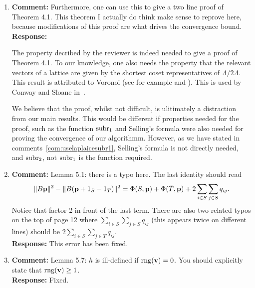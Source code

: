 \documentclass[a4paper,10pt]{article}
\begin{document}
\begin{enumerate}

\item\textbf{Comment:} \label{com:provethm4.1}
Furthermore, one can use this to give a two line proof of Theorem 4.1.  This theorem I actually do think make sense to reprove here, because modifications of this proof are what drives the convergence bound. 
\\\textbf{Response:}

The property decribed by the reviewer is indeed needed to give a proof of Theorem 4.1.  To our knowledge, one also needs the property that the relevant vectors of a lattice are given by the shortest coset representatives of $\Lambda / 2\Lambda$.  This result is attributed to Voronoi (see for example \cite[Theorem~2]{ConwaySloane1992_voronoi_lattice_3d_obtuse_superbases} and \cite[Theorem~3.2]{MicciancioVoulgaris_deterministic_jv_2013}).  This is used by Conway and Sloane in~\cite[Theorem~3]{ConwaySloane1992_voronoi_lattice_3d_obtuse_superbases}.

We believe that the proof, whilst not difficult, is ulitimately a distraction from our main results.  This would be different if properties needed for the proof, such as the function $\operatorname{subr}_1$ and Selling's formula were also needed for proving the convergence of our algorithmm.  However, as we have stated in comments~\ref{com:uselaplaicesubr1}, Selling's formula is not directly needed, and $\operatorname{subr}_2$, not $\operatorname{subr}_1$ is the function required. 

\item\textbf{Comment:} 
Lemma 5.1: there is a typo here.  The last identity should read
\[
\|B\mathbf{p}\|^2 - \|B(\mathbf{p} + 1_S - 1_T)\|^2 = \Phi(S,\mathbf{p}) + \Phi(\bar{T}, \mathbf{p}) + 2\sum_{i \in S}\sum_{j\in S} q_{ij}.
\]
Notice that factor 2 in front of the last term.  There are also two related typos on the top of page 12 where $\sum_{i \in S}\sum_{j\in S} q_{ij}$ (this appears twice on different lines) should be $2\sum_{i \in S}\sum_{j\in T} q_{ij}$.
\\\textbf{Response:}
This error has been fixed.


\item\textbf{Comment:} 
Lemma 5.7: $h$ is ill-defined if $\operatorname{rng}(\mathbf{v}) = 0$.  You should explicitly state that $\operatorname{rng}(\mathbf{v}) \geq 1$.
\\\textbf{Response:}
Fixed.


\end{enumerate}
\end{document}
